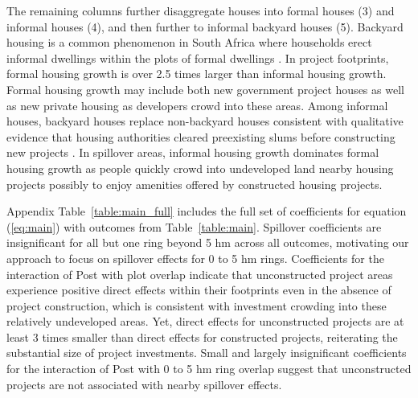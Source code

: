 \documentclass[12pt]{article}
\begin{document}
The remaining columns further disaggregate houses into formal houses (3) and informal houses (4), and then further to informal backyard houses (5).  Backyard housing is a common phenomenon in South Africa where households erect informal dwellings within the plots of formal dwellings \citep{Brueckner2018backyarding}.  In project footprints, formal housing growth is over 2.5 times larger than informal housing growth.  Formal housing growth may include both new government project houses as well as new private housing as developers crowd into these areas.  Among informal houses, backyard houses replace non-backyard houses consistent with qualitative evidence that housing authorities cleared preexisting slums before constructing new projects \citep{hofmeyr2008risk}.  In spillover areas, informal housing growth dominates formal housing growth as people quickly crowd into undeveloped land nearby housing projects possibly to enjoy amenities offered by constructed housing projects.

Appendix Table~\ref{table:main_full} includes the full set of coefficients for equation (\ref{eq:main}) with outcomes from  Table~\ref{table:main}.  Spillover coefficients are insignificant for all but one ring beyond 5 hm across all outcomes, motivating our approach to focus on spillover effects for 0 to 5 hm rings.  Coefficients for the interaction of Post with plot overlap indicate that unconstructed project areas experience positive direct effects within their footprints even in the absence of project construction, which is consistent with investment crowding into these relatively undeveloped areas.  Yet, direct effects for unconstructed projects are at least 3 times smaller than direct effects for constructed projects, reiterating the substantial size of project investments.  Small and largely insignificant coefficients for the interaction of Post with 0 to 5 hm ring overlap suggest that unconstructed projects are not associated with nearby spillover effects.  
\end{document}
